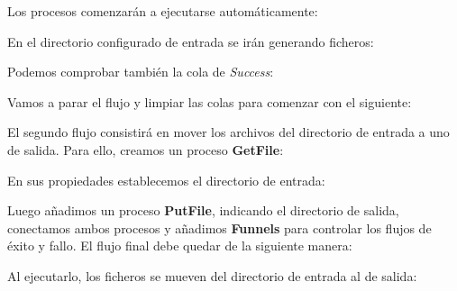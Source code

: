 \documentclass{../../miPlantilla}
\begin{document}

Los procesos comenzarán a ejecutarse automáticamente:


En el directorio configurado de entrada se irán generando ficheros:


\newpage

Podemos comprobar también la cola de \textit{Success}:


Vamos a parar el flujo y limpiar las colas para comenzar con el siguiente:


El segundo flujo consistirá en mover los archivos del directorio de entrada a uno de salida. Para ello, creamos un proceso \textbf{GetFile}:


\newpage

En sus propiedades establecemos el directorio de entrada:


Luego añadimos un proceso \textbf{PutFile}, indicando el directorio de salida, conectamos ambos procesos y añadimos \textbf{Funnels} para controlar los flujos de éxito y fallo.
El flujo final debe quedar de la siguiente manera:


Al ejecutarlo, los ficheros se mueven del directorio de entrada al de salida:

\end{document}

